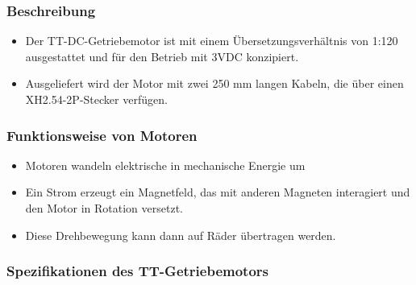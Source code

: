 \documentclass{vorlage-design-main}
\begin{document}
\hypertarget{beschreibung}{%
\subsubsection{Beschreibung}\label{beschreibung}}

\begin{itemize}

\item
  Der TT-DC-Getriebemotor ist mit einem Übersetzungsverhältnis von 1:120
  ausgestattet und für den Betrieb mit 3VDC konzipiert.
\item
  Ausgeliefert wird der Motor mit zwei 250 mm langen Kabeln, die über
  einen XH2.54-2P-Stecker verfügen.
\end{itemize}

\hypertarget{funktionsweise-von-motoren}{%
\subsubsection{Funktionsweise von
Motoren}\label{funktionsweise-von-motoren}}

\begin{itemize}

\item
  Motoren wandeln elektrische in mechanische Energie um
\item
  Ein Strom erzeugt ein Magnetfeld, das mit anderen Magneten interagiert
  und den Motor in Rotation versetzt.
\item
  Diese Drehbewegung kann dann auf Räder übertragen werden.
\end{itemize}

\hypertarget{spezifikationen-des-tt-getriebemotors}{%
\subsubsection{Spezifikationen des
TT-Getriebemotors}\label{spezifikationen-des-tt-getriebemotors}}
\end{document}
